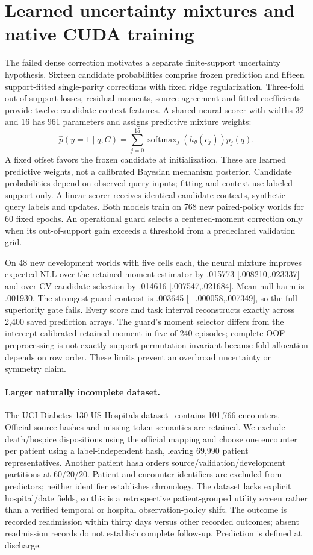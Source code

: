 \documentclass[10pt]{article}
\begin{document}
\section{Learned uncertainty mixtures and native CUDA training}
The failed dense correction motivates a separate finite-support uncertainty hypothesis. Sixteen candidate probabilities comprise frozen prediction and fifteen support-fitted single-parity corrections with fixed ridge regularization. Three-fold out-of-support losses, residual moments, source agreement and fitted coefficients provide twelve candidate-context features. A shared neural scorer with widths 32 and 16 has 961 parameters and assigns predictive mixture weights:
\begin{equation}
 \widehat p(y=1\mid q,C)=\sum_{j=0}^{15}\operatorname{softmax}_{j}(h_\theta(c_j))p_j(q).
\end{equation}
A fixed offset favors the frozen candidate at initialization. These are learned predictive weights, not a calibrated Bayesian mechanism posterior. Candidate probabilities depend on observed query inputs; fitting and context use labeled support only. A linear scorer receives identical candidate contexts, synthetic query labels and updates. Both models train on 768 new paired-policy worlds for 60 fixed epochs. An operational guard selects a centered-moment correction only when its out-of-support gain exceeds a threshold from a predeclared validation grid.

On 48 new development worlds with five cells each, the neural mixture improves expected NLL over the retained moment estimator by .015773 [.008210,.023337] and over CV candidate selection by .014616 [.007547,.021684]. Mean null harm is .001930. The strongest guard contrast is .003645 [$-$.000058,.007349], so the full superiority gate fails. Every score and task interval reconstructs exactly across 2,400 saved prediction arrays. The guard's moment selector differs from the intercept-calibrated retained moment in five of 240 episodes; complete OOF preprocessing is not exactly support-permutation invariant because fold allocation depends on row order. These limits prevent an overbroad uncertainty or symmetry claim.

\paragraph{Larger naturally incomplete dataset.}
The UCI Diabetes 130-US Hospitals dataset~\cite{diabetes130} contains 101,766 encounters. Official source hashes and missing-token semantics are retained. We exclude death/hospice dispositions using the official mapping and choose one encounter per patient using a label-independent hash, leaving 69,990 patient representatives. Another patient hash orders source/validation/development partitions at 60/20/20. Patient and encounter identifiers are excluded from predictors; neither identifier establishes chronology. The dataset lacks explicit hospital/date fields, so this is a retrospective patient-grouped utility screen rather than a verified temporal or hospital observation-policy shift. The outcome is recorded readmission within thirty days versus other recorded outcomes; absent readmission records do not establish complete follow-up. Prediction is defined at discharge.
\end{document}

